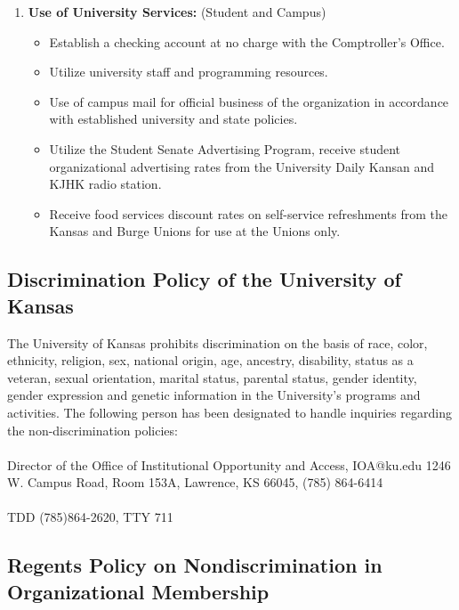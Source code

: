 \begin{enumerate}
	\item \textbf{Use of University Services:} (Student and Campus)
	\begin{itemize}
		\item Establish a checking account at no charge with the Comptroller's Office.
		\item Utilize university staff and programming resources.
		\item Use of campus mail for official business of the organization in accordance with established university and state policies.
		\item Utilize the Student Senate Advertising Program, receive student organizational advertising rates from the University Daily Kansan and KJHK radio station.
		\item Receive food services discount rates on self-service refreshments from the Kansas and Burge Unions for use at the Unions only.
	\end{itemize}
\end{enumerate}


\subsection{Discrimination Policy of the University of Kansas}

The University of Kansas prohibits discrimination on the basis of race, color, ethnicity, religion, sex, national origin, age, ancestry, disability, status as a veteran, sexual orientation, marital status, parental status, gender identity, gender expression and genetic information in the University’s programs and activities. The following person has been designated to handle inquiries regarding the non-discrimination policies:
\\ 
\\
Director of the Office of Institutional Opportunity and Access, IOA@ku.edu
1246 W. Campus Road, Room 153A, Lawrence, KS 66045, (785) 864-6414
\\
\\
TDD (785)864-2620, TTY 711

\subsection{Regents Policy on Nondiscrimination in Organizational Membership}

